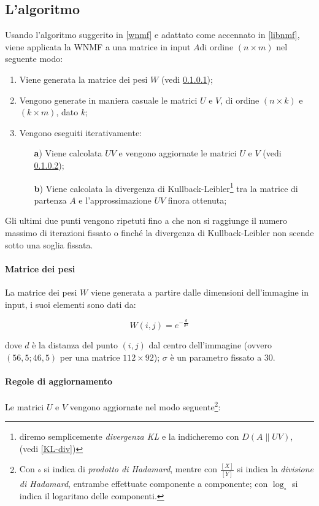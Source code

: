 \documentclass[a4paper]{article} %
\begin{document}
\subsection{L'algoritmo}
Usando l'algoritmo suggerito in \ref{wnmf} e adattato come accennato in \ref{libnmf}, viene applicata la WNMF a una matrice in input $A$di ordine $(n \times m)$ nel seguente modo:
\begin{enumerate}
\item Viene generata la matrice dei pesi $W$ (vedi \ref{W});
\item Vengono generate in maniera casuale le matrici $U$ e $V$, di ordine $(n \times k)$ e $(k \times m)$, dato $k$;
  \item Vengono eseguiti iterativamente:
    \begin{itemize}
    \item[\textbf{a})] Viene calcolata $UV$ e vengono aggiornate le matrici $U$ e $V$ (vedi \ref{updaterules});
    \item[\textbf{b})] Viene calcolata la divergenza di Kullback-Leibler\footnote{diremo semplicemente \emph{divergenza KL} e la indicheremo con $D(A\lVert UV)$, (vedi \ref{KL-div})} tra la matrice di partenza $A$ e l'approssimazione $UV$ finora ottenuta;
    \end{itemize}
\end{enumerate}
Gli ultimi due punti vengono ripetuti fino a che non si raggiunge il numero massimo di iterazioni fissato o finché la divergenza di Kullback-Leibler non scende sotto una soglia fissata.


\paragraph{Matrice dei pesi}\label{W}
La matrice dei pesi $W$ viene generata a partire dalle dimensioni dell'immagine in input, i suoi elementi sono dati da:

\[ W(i,j) = e^{-\frac{d}{\sigma^2}} \]

dove $d$ è la distanza del punto $(i,j)$ dal centro dell'immagine (ovvero $(56,5 ; 46,5)$ per una matrice $112 \times 92$); $\sigma$ è un parametro fissato a $30$.

\paragraph{Regole di aggiornamento}\label{updaterules}
Le matrici $U$ e $V$ vengono aggiornate nel modo seguente\footnote{Con $\circ$ si indica di \emph{prodotto di Hadamard}, mentre con $\frac{[X]}{[Y]}$ si indica la \emph{divisione di Hadamard}, entrambe effettuate componente a componente; con $\log_{\circ}$ si indica il logaritmo delle componenti.}:
\end{document}
